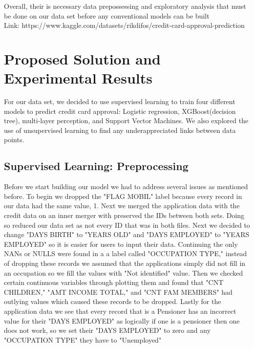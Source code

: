 \documentclass[12pt]{article}
\begin{document}
\noindent Overall, their is necessary data prepossessing and exploratory analysis that must be done on our data set before any conventional models can be built\\

Link: https://www.kaggle.com/datasets/rikdifos/credit-card-approval-prediction\\

\section{Proposed Solution and Experimental Results}

\noindent For our data set, we decided to use supervised learning to train four different models to predict credit card approval: Logistic regression, XGBoost(decision tree), multi-layer perception, and Support Vector Machines. We also explored the use of unsupervised learning to find any underappreciated links between data points.\\

\subsection{Supervised Learning: Preprocessing}

\noindent Before we start building our model we had to address several issues as mentioned before. To begin we dropped the "FLAG MOBIL" label because every record in our data had the same value, 1. Next we merged the application data with the credit data on an inner merger with preserved the IDs between both sets. Doing so reduced our data set as not every ID that was in both files. Next we decided to change "DAYS BIRTH" to "YEARS OLD" and "DAYS EMPLOYED" to "YEARS EMPLOYED" so it is easier for users to input their data. Continuing the only NANs or NULLS were found in a a label called "OCCUPATION TYPE," instead of dropping these records we assumed that the applications simply did not fill in an occupation so we fill the values with "Not identified" value. Then we checked certain continuous variables through plotting them and found that "CNT CHILDREN," "AMT INCOME TOTAL," and "CNT FAM MEMBERS" had outlying values which caused these records to be dropped. Lastly for the application data we see that every record that is a Pensioner has an incorrect value for their "DAYS EMPLOYED" as logically if one is a pensioner then one does not work, so we set their "DAYS EMPLOYED" to zero and any "OCCUPATION TYPE" they have to "Unemployed"\\
\end{document}
